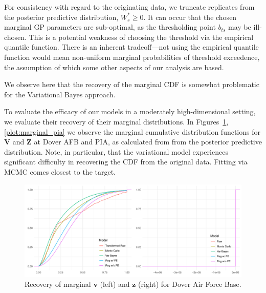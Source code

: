     For consistency with regard to the originating data, we truncate replicates 
    from the posterior predictive distribution, $W_{s}^* \geq 0$.  It can occur 
    that the chosen marginal GP parameters are sub-optimal, as the thresholding
    point $b_{ts}$ may be ill-chosen.  This is a potential weakness of choosing
    the threshold via the empirical quantile function.  There is an inherent 
    tradeoff---not using the empirical quantile function would mean non-uniform 
    marginal probabilities of threshold exceedence, the assumption of which some 
    other aspects of our analysis are based.
    
    We observe here that 
    the recovery of the marginal CDF is somewhat problematic for the Variational Bayes
    approach. 


To evaluate the efficacy of our models in a moderately high-dimensional setting,
    we evaluate their recovery of their marginal distributions.  In 
    Figures~\ref{plot:marginal_doverafb},\ref{plot:marginal_pia} we observe the marginal 
    cumulative distribution functions for $\bm{V}$ and $\bm{Z}$ at Dover AFB and PIA,
    as calculated from from the posterior predictive distribution.  Note, in particular,
    that the variational model experiences significant difficulty in recovering the
    CDF from the original data.  Fitting via MCMC comes closest to the target.
    
\begin{figure}[ht]
    \caption{Recovery of marginal $\bm{v}$ (left) and $\bm{z}$ (right) for 
        Dover Air Force Base.
        \label{plot:marginal_doverafb}}
    \centering
    \includegraphics[width=\textwidth]{./plots/delaware_marginal_dover_afb}
\end{figure}










